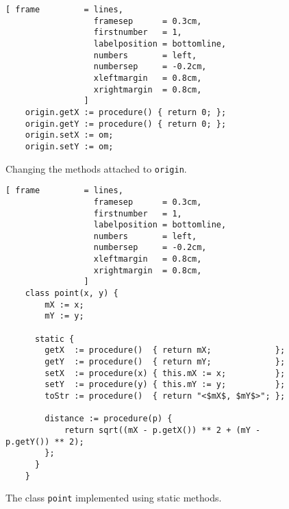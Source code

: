 \begin{figure}[!ht]
\centering
\begin{Verbatim}[ frame         = lines, 
                  framesep      = 0.3cm, 
                  firstnumber   = 1,
                  labelposition = bottomline,
                  numbers       = left,
                  numbersep     = -0.2cm,
                  xleftmargin   = 0.8cm,
                  xrightmargin  = 0.8cm,
                ]
    origin.getX := procedure() { return 0; };
    origin.getY := procedure() { return 0; };
    origin.setX := om;
    origin.setY := om;
\end{Verbatim}
\vspace*{-0.3cm}
\caption{Changing the methods attached to \texttt{origin}.}
\label{fig:point.stlx-origin}
\end{figure}

\begin{figure}[!htb]
\centering
\begin{Verbatim}[ frame         = lines, 
                  framesep      = 0.3cm, 
                  firstnumber   = 1,
                  labelposition = bottomline,
                  numbers       = left,
                  numbersep     = -0.2cm,
                  xleftmargin   = 0.8cm,
                  xrightmargin  = 0.8cm,
                ]
    class point(x, y) {
        mX := x;
        mY := y;
    
      static {
        getX  := procedure()  { return mX;             };
        getY  := procedure()  { return mY;             };
        setX  := procedure(x) { this.mX := x;          };
        setY  := procedure(y) { this.mY := y;          };
        toStr := procedure()  { return "<$mX$, $mY$>"; };
 
        distance := procedure(p) {
            return sqrt((mX - p.getX()) ** 2 + (mY - p.getY()) ** 2);
        };
      }
    }
\end{Verbatim}
\vspace*{-0.3cm}
\caption{The class \texttt{point} implemented using static methods.}
\label{fig:point-static.stlx}
\end{figure}

